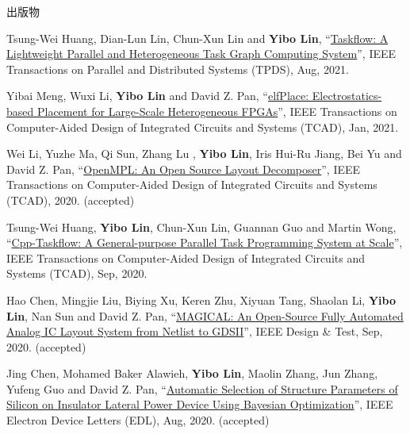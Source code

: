\begin{rSection}{出版物}
\begin{description}[font=\normalfont]
\item[{[J28]}]{
        Tsung-Wei Huang, Dian-Lun Lin, Chun-Xun Lin and \textbf{Yibo Lin}, 
    ``\href{https://doi.org/10.1109/TPDS.2021.3104255}{Taskflow: A Lightweight Parallel and Heterogeneous Task Graph Computing System}'', 
    IEEE Transactions on Parallel and Distributed Systems (TPDS), Aug, 2021.
    
}
            

\item[{[J27]}]{
        Yibai Meng, Wuxi Li, \textbf{Yibo Lin} and David Z. Pan, 
    ``\href{https://doi.org/10.1109/TCAD.2021.3053191}{elfPlace: Electrostatics-based Placement for Large-Scale Heterogeneous FPGAs}'', 
    IEEE Transactions on Computer-Aided Design of Integrated Circuits and Systems (TCAD), Jan, 2021.
    
}
            

\item[{[J26]}]{
        Wei Li, Yuzhe Ma, Qi Sun,  Zhang Lu , \textbf{Yibo Lin}, Iris Hui-Ru Jiang, Bei Yu and David Z. Pan, 
    ``\href{https://doi.org/10.1109/TCAD.2020.3042175}{OpenMPL: An Open Source Layout Decomposer}'', 
    IEEE Transactions on Computer-Aided Design of Integrated Circuits and Systems (TCAD), 2020.
    (accepted)
}
            

\item[{[J25]}]{
        Tsung-Wei Huang, \textbf{Yibo Lin}, Chun-Xun Lin, Guannan Guo and Martin Wong, 
    ``\href{https://doi.org/10.1109/TCAD.2021.3082507}{Cpp-Taskflow: A General-purpose Parallel Task Programming System at Scale}'', 
    IEEE Transactions on Computer-Aided Design of Integrated Circuits and Systems (TCAD), Sep, 2020.
    
}
            

\item[{[J24]}]{
        Hao Chen, Mingjie Liu, Biying Xu, Keren Zhu, Xiyuan Tang, Shaolan Li, \textbf{Yibo Lin}, Nan Sun and David Z. Pan, 
    ``\href{https://doi.org/10.1109/MDAT.2020.3024153}{MAGICAL: An Open-Source Fully Automated Analog IC Layout System from Netlist to GDSII}'', 
    IEEE Design \& Test, Sep, 2020.
    (accepted)
}
            

\item[{[J23]}]{
        Jing Chen, Mohamed Baker Alawieh, \textbf{Yibo Lin}, Maolin Zhang, Jun Zhang, Yufeng Guo and David Z. Pan, 
    ``\href{https://doi.org/10.1109/LED.2020.3013571}{Automatic Selection of Structure Parameters of Silicon on Insulator Lateral Power Device Using Bayesian Optimization}'', 
    IEEE Electron Device Letters (EDL), Aug, 2020.
    (accepted)
}
            


\end{description}
\end{rSection}
